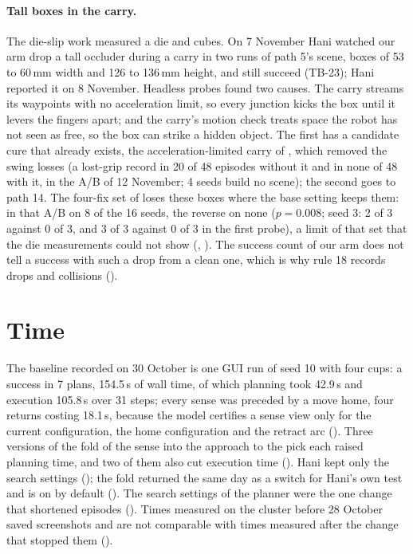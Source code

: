\paragraph{Tall boxes in the carry.} The die-slip work measured a die and cubes. On 7
November Hani watched our arm drop a tall occluder during a carry in two runs of path
5's scene, boxes of 53 to 60\,mm width and 126 to 136\,mm height, and still succeed
(TB-23); Hani reported it on 8 November. Headless probes found two causes. The carry streams its waypoints with no
acceleration limit, so every junction kicks the box until it levers the fingers apart;
and the carry's motion check treats space the robot has not seen as free, so the box can
strike a hidden object. The first has a candidate cure that already exists, the
acceleration-limited carry of , which removed the swing losses (a lost-grip record
in 20 of 48 episodes without it and in none of 48 with it, in the A/B of 12 November; 4
seeds build no scene); the second goes to path 14. The four-fix set of  loses these
boxes where the base setting keeps them: in that A/B on 8 of the 16 seeds, the reverse on
none ($p = 0.008$; seed 3: 2 of 3 against 0 of 3, and 3 of 3 against 0 of 3 in the first
probe), a limit of that set that the die measurements could
not show (, ). The success count of our arm does not tell a
success with such a drop from a clean one, which is why rule 18 records drops and
collisions ().

\section{Time}
\label{sec:time-findings}

The baseline recorded on 30 October is one GUI run of seed 10 with four cups: a
success in 7 plans, 154.5\,s of wall time, of which planning took 42.9\,s and
execution 105.8\,s over 31 steps; every sense was preceded by a move home, four
returns costing 18.1\,s, because the model certifies a sense view only for the
current configuration, the home configuration and the retract arc (). Three
versions of the fold of the sense into the approach to the pick each raised planning
time, and two of them also cut execution time (). Hani kept only the search
settings (); the fold returned the same day as a switch for Hani's own test
and is on by default (). The search settings of the planner were the one change that
shortened episodes (). Times measured on the cluster before 28
October saved screenshots and are not comparable with times measured after the
change that stopped them ().

